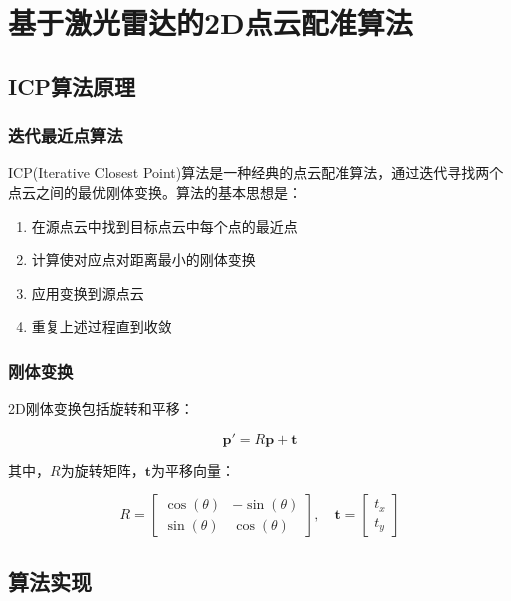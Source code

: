 \documentclass[12pt,a4paper]{report}
\begin{document}
\chapter{基于激光雷达的2D点云配准算法}

\section{ICP算法原理}

\subsection{迭代最近点算法}

ICP(Iterative Closest Point)算法是一种经典的点云配准算法，通过迭代寻找两个点云之间的最优刚体变换。算法的基本思想是：

\begin{enumerate}[itemsep=0pt]
    \item 在源点云中找到目标点云中每个点的最近点
    \item 计算使对应点对距离最小的刚体变换
    \item 应用变换到源点云
    \item 重复上述过程直到收敛
\end{enumerate}

\subsection{刚体变换}

2D刚体变换包括旋转和平移：

\begin{equation}
\mathbf{p}' = R \mathbf{p} + \mathbf{t}
\end{equation}

其中，$R$为旋转矩阵，$\mathbf{t}$为平移向量：

\begin{equation}
R = 
\begin{bmatrix}
\cos(\theta) & -\sin(\theta) \\
\sin(\theta) & \cos(\theta)
\end{bmatrix}, \quad
\mathbf{t} = 
\begin{bmatrix}
t_x \\
t_y
\end{bmatrix}
\end{equation}

\section{算法实现}
\end{document}
